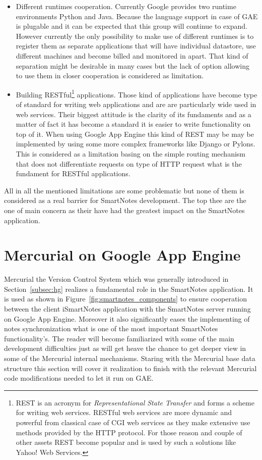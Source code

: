 \begin{itemize}
\item{Different runtimes cooperation. Currently Google provides two runtime environments Python and Java. Because the language support in case of GAE is plugable and it can be expected that this group will continue to expand. However currently the only possibility to make use of different runtimes is to register them as separate applications that will have individual datastore, use different machines and become billed and monitored in apart. That kind of separation might be desirable in many cases but the lack of option allowing to use them in closer cooperation is considered as limitation.}

\item{Building RESTful\footnote{REST is an acronym for \textit{Representational State Transfer} and forms a scheme for writing web services. RESTful web services are more dynamic and powerful from classical case of CGI web services as they make extensive use  methods provided by the HTTP protocol. For those reason and couple of other assets REST become popular and is used by such a solutions like Yahoo! Web Services.} applications. Those kind of applications have become type of standard for writing web applications and are are particularly wide used in web services. Their biggest attitude is the clarity of its fundaments and as a matter of fact it has become a standard it is easier to write functionality on top of it. When using Google App Engine this kind of REST may be may be implemented by using some more complex frameworks like Django or Pylons. This is considered as a limitation basing on the simple routing mechanism that does not differentiate requests on type of HTTP request what is the fundament for RESTful applications.}
\end{itemize}
All in all the mentioned limitations are some problematic but none of them is considered as a real barrier for SmartNotes development. The top thee are the one of main concern as their have had the greatest impact on the SmartNotes application. 
\section{Mercurial on Google App Engine}\label{sec:hg_on_gae}
Mercurial the Version Control System which was generally introduced in Section~\ref{subsec:hg} realizes a fundamental role in the SmartNotes application. It is used as shown in Figure~\ref{fig:smartnotes_components} to ensure cooperation between the client iSmartNotes application with the SmartNotes server running on Google App Engine. Moreover it also significantly eases the implementing of notes synchronization what is one of the most important SmartNotes functionality's. The reader will become familiarized with some of the main development difficulties just as will get heave the chance to get deeper view in some of the Mercurial internal mechanisms. Staring with the Mercurial base data structure this section will cover it realization to finish with the relevant Mercurial code modifications needed to let it run on GAE.

